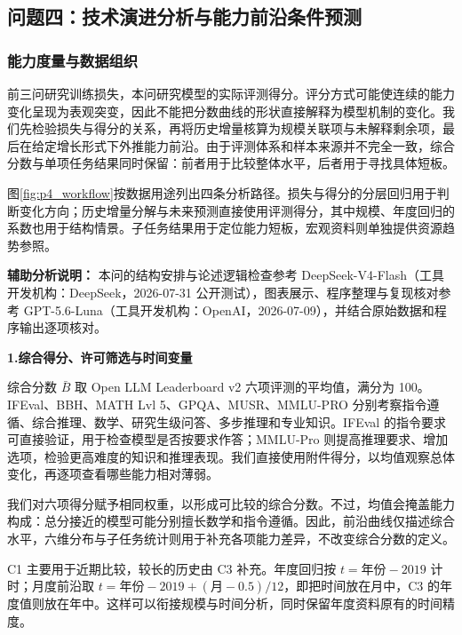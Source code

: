\subsection{问题四：技术演进分析与能力前沿条件预测}
\begingroup
\setlength{\tabcolsep}{4pt}
\renewcommand{\arraystretch}{1.15}

\subsubsection{能力度量与数据组织}

前三问研究训练损失，本问研究模型的实际评测得分。评分方式可能使连续的能力变化呈现为表观突变\cite{schaeffer2023mirage}，因此不能把分数曲线的形状直接解释为模型机制的变化。我们先检验损失与得分的关系，再将历史增量核算为规模关联项与未解释剩余项，最后在给定增长形式下外推能力前沿。由于评测体系和样本来源并不完全一致，综合分数与单项任务结果同时保留：前者用于比较整体水平，后者用于寻找具体短板。

图\ref{fig:p4_workflow}按数据用途列出四条分析路径。损失与得分的分层回归用于判断变化方向；历史增量分解与未来预测直接使用评测得分，其中规模、年度回归的系数也用于结构情景。子任务结果用于定位能力短板，宏观资料则单独提供资源趋势参照。

\noindent\textbf{辅助分析说明：} 本问的结构安排与论述逻辑检查参考 DeepSeek-V4-Flash（工具开发机构：DeepSeek，2026-07-31 公开测试），图表展示、程序整理与复现核对参考 GPT-5.6-Luna（工具开发机构：OpenAI，2026-07-09），并结合原始数据和程序输出逐项核对。

\textbf{1.综合得分、许可筛选与时间变量}\par\nopagebreak[4]
综合分数 $\bar B$ 取 Open LLM Leaderboard v2 六项评测的平均值，满分为 100\cite{openllm2025}。IFEval、BBH、MATH Lvl 5、GPQA、MUSR、MMLU-PRO 分别考察指令遵循、综合推理、数学、研究生级问答、多步推理和专业知识。IFEval 的指令要求可直接验证，用于检查模型是否按要求作答\cite{zhou2023ifeval}；MMLU-Pro 则提高推理要求、增加选项，检验更高难度的知识和推理表现\cite{wang2024mmlupro}。我们直接使用附件得分，以均值观察总体变化，再逐项查看哪些能力相对薄弱。

我们对六项得分赋予相同权重，以形成可比较的综合分数。不过，均值会掩盖能力构成：总分接近的模型可能分别擅长数学和指令遵循。因此，前沿曲线仅描述综合水平，六维分布与子任务统计则用于补充各项能力差异，不改变综合分数的定义。

C1 主要用于近期比较，较长的历史由 C3 补充。年度回归按 $t=\text{年份}-2019$ 计时；月度前沿取 \mbox{$t=\text{年份}-2019+(\text{月}-0.5)/12$}，即把时间放在月中，C3 的年度值则放在年中。这样可以衔接规模与时间分析，同时保留年度资料原有的时间精度。

